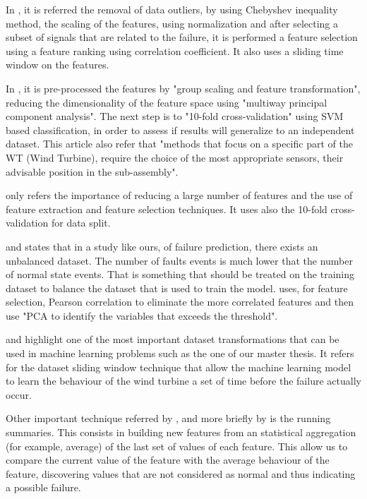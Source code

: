 In \cite{OLD_19_WIND}, it is referred the removal of data outliers, by using Chebyshev inequality method, the scaling of the features, using normalization and after selecting a subset of signals that are related to the failure, it is performed a feature selection using a feature ranking using correlation coefficient. It also uses a sliding time window on the features.

In \cite{N_2_WIND}, it is pre-processed the features by "group scaling and feature transformation", reducing the dimensionality of the feature space using "multiway principal component analysis". The next step is to "10-fold cross-validation" using SVM based classification, in order to assess if results will generalize to an independent dataset. This article also refer that "methods that focus on a specific part of the WT (Wind Turbine), require the choice of the most appropriate sensors, their advisable position in the sub-assembly".

\cite{39_WIND} only refers the importance of reducing a large number of features and the use of feature extraction and feature selection techniques. It uses also the 10-fold cross-validation for data split.

\cite{N_3_WIND} and \cite{OLD_41_WIND} states that in a study like ours, of failure prediction, there exists an unbalanced dataset. The number of faults events is much lower that the number of normal state events. That is something that should be treated on the training dataset to balance the dataset that is used to train the model.
\cite{N_4_WIND} uses, for feature selection, Pearson correlation to eliminate the more correlated features and then use "PCA to identify the variables that exceeds the threshold".

\cite{TDC_1} and \cite{MED_1} highlight one of the most important dataset transformations that can be used in machine learning problems such as the one of our master thesis. It refers for the dataset sliding window technique that allow the machine learning model to learn the behaviour of the wind turbine a set of time before the failure actually occur.

Other important technique referred by \cite{MED_1}, and more briefly by \cite{N_7_GENERAL} is the running summaries. This consists in building new features from an statistical aggregation (for example, average) of the last set of values of each feature. This allow us to compare the current value of the feature with the average behaviour of the feature, discovering values that are not considered as normal and thus indicating a possible failure.

